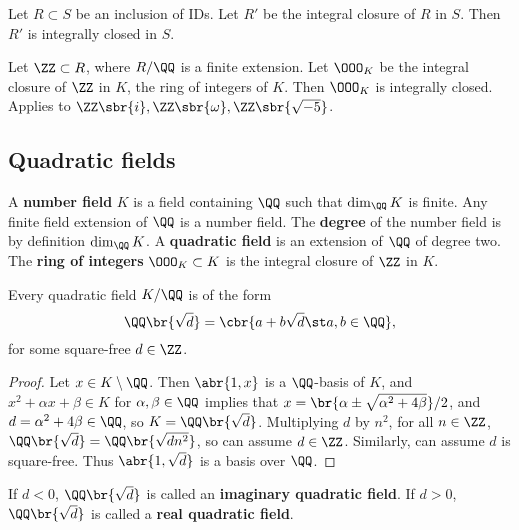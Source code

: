 \begin{theorem}
Let $ R \subset S $ be an inclusion of IDs. Let $ R' $ be the integral closure of $ R $ in $ S $. Then $ R' $ is integrally closed in $ S $.
\end{theorem}

\begin{example*}
Let $ \ZZ \subset R $, where $ R / \QQ $ is a finite extension. Let $ \OOO_K $ be the integral closure of $ \ZZ $ in $ K $, the ring of integers of $ K $. Then $ \OOO_K $ is integrally closed. Applies to $ \ZZ\sbr{i}, \ZZ\sbr{\omega}, \ZZ\sbr{\sqrt{-5}} $.
\end{example*}

\subsection{Quadratic fields}

A \textbf{number field} $ K $ is a field containing $ \QQ $ such that $ \dim_\QQ K $ is finite. Any finite field extension of $ \QQ $ is a number field. The \textbf{degree} of the number field is by definition $ \dim_\QQ K $. A \textbf{quadratic field} is an extension of $ \QQ $ of degree two. The \textbf{ring of integers} $ \OOO_K \subset K $ is the integral closure of $ \ZZ $ in $ K $.

\begin{lemma}
Every quadratic field $ K / \QQ $ is of the form
$$ \QQ\br{\sqrt{d}} = \cbr{a + b\sqrt{d} \st a, b \in \QQ}, $$
for some square-free $ d \in \ZZ $.
\end{lemma}

\begin{proof}
Let $ x \in K \setminus \QQ $. Then $ \abr{1, x} $ is a $ \QQ $-basis of $ K $, and $ x^2 + \alpha x + \beta \in K $ for $ \alpha, \beta \in \QQ $ implies that $ x = \br{\alpha \pm\sqrt{\alpha^2 + 4\beta}} / 2 $, and $ d = \alpha^2 + 4\beta \in \QQ $, so $ K = \QQ\br{\sqrt{d}} $. Multiplying $ d $ by $ n^2 $, for all $ n \in \ZZ $, $ \QQ\br{\sqrt{d}} = \QQ\br{\sqrt{dn^2}} $, so can assume $ d \in \ZZ $. Similarly, can assume $ d $ is square-free. Thus $ \abr{1, \sqrt{d}} $ is a basis over $ \QQ $.
\end{proof}

\begin{remark*}
If $ d < 0 $, $ \QQ\br{\sqrt{d}} $ is called an \textbf{imaginary quadratic field}. If $ d > 0 $, $ \QQ\br{\sqrt{d}} $ is called a \textbf{real quadratic field}.
\end{remark*}

